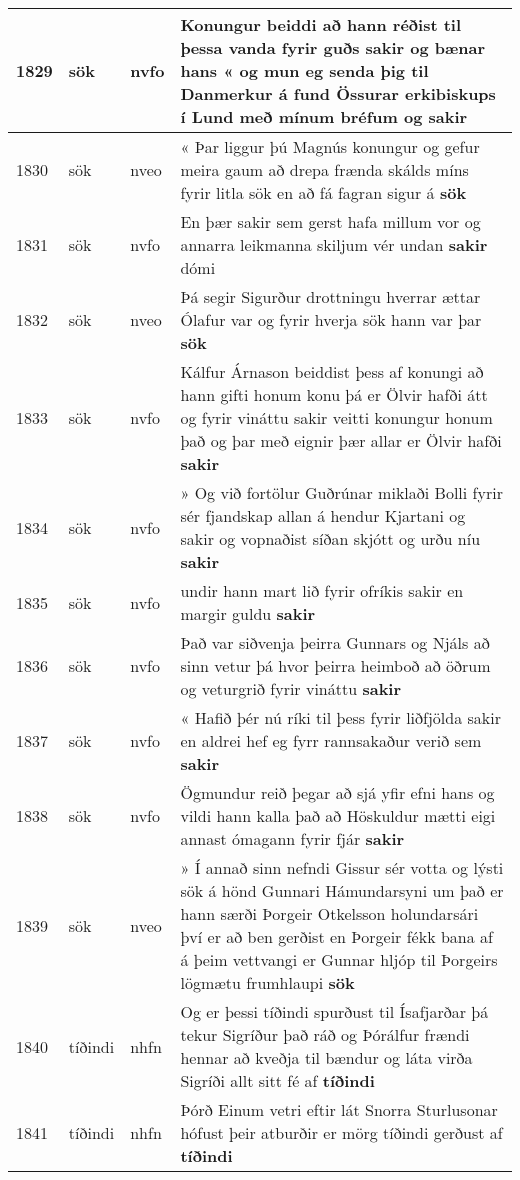 \documentclass{article}
\begin{document}
\begin{longtable}{p{1cm}|p{1cm}|p{1cm}|p{13cm}}
\hline
1829&sök&nvfo&Konungur beiddi að hann réðist til þessa vanda fyrir guðs sakir og bænar hans « og mun eg senda þig til Danmerkur á fund Össurar erkibiskups í Lund með mínum bréfum og \textbf{sakir} \\
\hline
1830&sök&nveo&« Þar liggur þú Magnús konungur og gefur meira gaum að drepa frænda skálds míns fyrir litla sök en að fá fagran sigur á \textbf{sök} \\
\hline
1831&sök&nvfo&En þær sakir sem gerst hafa millum vor og annarra leikmanna skiljum vér undan \textbf{sakir} dómi\\
\hline
1832&sök&nveo&Þá segir Sigurður drottningu hverrar ættar Ólafur var og fyrir hverja sök hann var þar \textbf{sök} \\
\hline
1833&sök&nvfo&Kálfur Árnason beiddist þess af konungi að hann gifti honum konu þá er Ölvir hafði átt og fyrir vináttu sakir veitti konungur honum það og þar með eignir þær allar er Ölvir hafði \textbf{sakir} \\
\hline
1834&sök&nvfo&» Og við fortölur Guðrúnar miklaði Bolli fyrir sér fjandskap allan á hendur Kjartani og sakir og vopnaðist síðan skjótt og urðu níu \textbf{sakir} \\
\hline
1835&sök&nvfo&undir hann mart lið fyrir ofríkis sakir en margir guldu \textbf{sakir} \\
\hline
1836&sök&nvfo&Það var siðvenja þeirra Gunnars og Njáls að sinn vetur þá hvor þeirra heimboð að öðrum og veturgrið fyrir vináttu \textbf{sakir} \\
\hline
1837&sök&nvfo&« Hafið þér nú ríki til þess fyrir liðfjölda sakir en aldrei hef eg fyrr rannsakaður verið sem \textbf{sakir} \\
\hline
1838&sök&nvfo&Ögmundur reið þegar að sjá yfir efni hans og vildi hann kalla það að Höskuldur mætti eigi annast ómagann fyrir fjár \textbf{sakir} \\
\hline
1839&sök&nveo&» Í annað sinn nefndi Gissur sér votta og lýsti sök á hönd Gunnari Hámundarsyni um það er hann særði Þorgeir Otkelsson holundarsári því er að ben gerðist en Þorgeir fékk bana af á þeim vettvangi er Gunnar hljóp til Þorgeirs lögmætu frumhlaupi \textbf{sök} \\
\hline
1840&tíðindi&nhfn&Og er þessi tíðindi spurðust til Ísafjarðar þá tekur Sigríður það ráð og Þórálfur frændi hennar að kveðja til bændur og láta virða Sigríði allt sitt fé af \textbf{tíðindi} \\
\hline
1841&tíðindi&nhfn&Þórð Einum vetri eftir lát Snorra Sturlusonar hófust þeir atburðir er mörg tíðindi gerðust af \textbf{tíðindi} \\

\end{longtable}
\end{document}
